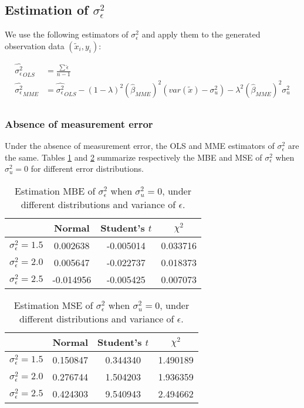 \documentclass{article}
\begin{document}
\subsection{Estimation of $\sigma^2_\epsilon$}

We use the following estimators of $\sigma^2_\epsilon$ and apply them to the generated observation data $(\tilde{x}_i, y_i)$:

\begin{equation}
    \begin{split}
        \hat{\sigma^2_\epsilon}_{OLS} &= \frac{\sum \hat{\epsilon}}{n-1}\\
        \hat{\sigma_\epsilon^2}_{MME} &= \hat{\sigma^2_\epsilon}_{OLS} -  (1-\lambda)^2 (\hat{\beta}_{MME})^2 (var(\tilde{x}) - \sigma^2_u) - \lambda^2 (\hat{\beta}_{MME})^2 \sigma_u^2\\
    \end{split}
\end{equation}

\subsubsection{Absence of measurement error}

Under the absence of measurement error, the OLS and MME estimators of $\sigma^2_\epsilon$ are the same. 
Tables \ref{Tab:MBE_sigma_absence} and \ref{Tab:MSE_sigma_absence} summarize respectively the MBE and MSE of $\sigma^2_\epsilon$ when $\sigma^2_u=0$ for different error distributions.

\begin{table}[ht]
    \centering
    \caption{Estimation MBE of $\sigma^2_\epsilon$ when $\sigma^2_u=0$, under different distributions and variance of $\epsilon$.}
    \label{Tab:MBE_sigma_absence}
    \begin{tabular}[t]{lccc}
        \hline
        &Normal&Student's $t$&$\chi^2$\\
        \hline
        $\sigma^2_\epsilon = 1.5$&0.002638&-0.005014&0.033716\\
        $\sigma^2_\epsilon = 2.0$&0.005647&-0.022737&0.018373\\
        $\sigma^2_\epsilon = 2.5$&-0.014956&-0.005425&0.007073\\
        \hline
    \end{tabular}
\end{table}

\begin{table}[ht]
    \centering
    \caption{Estimation MSE of $\sigma^2_\epsilon$ when $\sigma^2_u=0$, under different distributions and variance of $\epsilon$.}
    \label{Tab:MSE_sigma_absence}
    \begin{tabular}[t]{lccc}
        \hline
        &Normal&Student's $t$&$\chi^2$\\
        \hline
        $\sigma^2_\epsilon = 1.5$&0.150847&0.344340&1.490189\\
        $\sigma^2_\epsilon = 2.0$&0.276744&1.504203&1.936359\\
        $\sigma^2_\epsilon = 2.5$&0.424303&9.540943&2.494662\\
        \hline
    \end{tabular}
\end{table}
\end{document}
